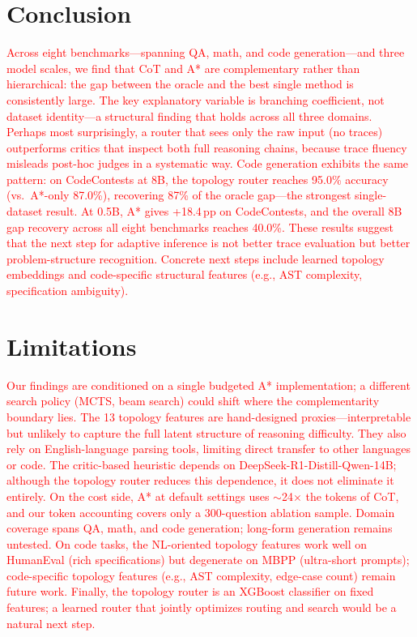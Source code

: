 \documentclass[11pt]{article}
\begin{document}
{\section{Conclusion}
\textcolor{red}{Across eight benchmarks---spanning QA, math, and code generation---and three model scales, we find that CoT and A* are complementary rather than hierarchical: the gap between the oracle and the best single method is consistently large. The key explanatory variable is branching coefficient, not dataset identity---a structural finding that holds across all three domains. Perhaps most surprisingly, a router that sees only the raw input (no traces) outperforms critics that inspect both full reasoning chains, because trace fluency misleads post-hoc judges in a systematic way. Code generation exhibits the same pattern: on CodeContests at 8B, the topology router reaches 95.0\% accuracy (vs.\ A*-only 87.0\%), recovering 87\% of the oracle gap---the strongest single-dataset result. At 0.5B, A* gives +18.4\,pp on CodeContests, and the overall 8B gap recovery across all eight benchmarks reaches 40.0\%. These results suggest that the next step for adaptive inference is not better trace evaluation but better problem-structure recognition. Concrete next steps include learned topology embeddings and code-specific structural features (e.g., AST complexity, specification ambiguity).}

\section*{Limitations}
\label{sec:limitations}
\textcolor{red}{Our findings are conditioned on a single budgeted A* implementation; a different search policy (MCTS, beam search) could shift where the complementarity boundary lies. The 13 topology features are hand-designed proxies---interpretable but unlikely to capture the full latent structure of reasoning difficulty. They also rely on English-language parsing tools, limiting direct transfer to other languages or code. The critic-based heuristic depends on DeepSeek-R1-Distill-Qwen-14B; although the topology router reduces this dependence, it does not eliminate it entirely. On the cost side, A* at default settings uses $\sim$24$\times$ the tokens of CoT, and our token accounting covers only a 300-question ablation sample. Domain coverage spans QA, math, and code generation; long-form generation remains untested. On code tasks, the NL-oriented topology features work well on HumanEval (rich specifications) but degenerate on MBPP (ultra-short prompts); code-specific topology features (e.g., AST complexity, edge-case count) remain future work. Finally, the topology router is an XGBoost classifier on fixed features; a learned router that jointly optimizes routing and search would be a natural next step.}

}
\end{document}
